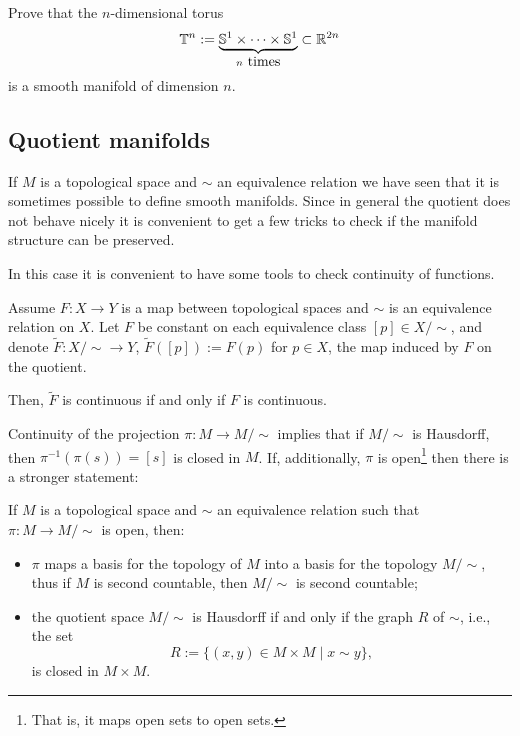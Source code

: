 \begin{exercise}
  Prove that the $n$-dimensional torus
  \begin{equation}
    \bT^n := \LaTeXunderbrace{\bS^1\times\cdots\times\bS^1}_{n\mbox{ times}} \subset \R^{2n}
  \end{equation}
  is a smooth manifold of dimension $n$.
\end{exercise}

\subsection{Quotient manifolds}\label{sec:quotient}

If $M$ is a topological space and $\sim$ an equivalence relation we have seen that it is sometimes possible to define smooth manifolds.
Since in general the quotient does not behave nicely it is convenient to get a few tricks to check if the manifold structure can be preserved.

In this case it is convenient to have some tools to check continuity of functions.

\begin{proposition}
  Assume $F:X\to Y$ is a map between topological spaces and $\sim$ is an equivalence relation on $X$.
  Let $F$ be constant on each equivalence class $[p]\in X/\!\sim$, and denote $\widetilde F:X/\!\sim\to Y$, $\widetilde F([p]) := F(p)$ for $p\in X$, the map induced by $F$ on the quotient.

  Then, $\widetilde F$ is continuous if and only if $F$ is continuous.
\end{proposition}

Continuity of the projection $\pi: M \to M/\!\sim$ implies that if $M/\!\sim$ is Hausdorff, then $\pi^{-1}(\pi(s)) = [s]$ is closed in $M$.
If, additionally, $\pi$ is open\footnote{That is, it maps open sets to open sets.} then there is a stronger statement:
\begin{theorem}\label{thm:openproj}
  If $M$ is a topological space and $\sim$ an equivalence relation such that $\pi:M \to M/\!\sim$ is open, then:
  \begin{itemize}
    \item $\pi$ maps a basis for the topology of $M$ into a basis for the topology $M/\!\sim$, thus if $M$ is second countable, then $M/\!\sim$ is second countable;
    \item the quotient space $M/\!\sim$ is Hausdorff if and only if the graph $R$ of $\sim$, i.e., the set
          \begin{equation}
            R := \{(x,y)\in M\times M \mid x\sim y\},
          \end{equation}
          is closed in $M\times M$.
  \end{itemize}
\end{theorem}


